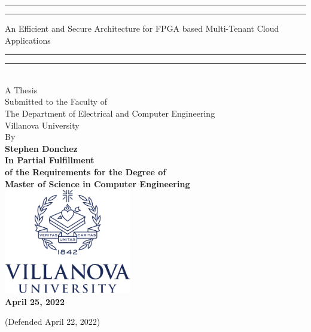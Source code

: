 \begin{titlepage}
    \begingroup

\centering

\sffamily\bfseries\fontsize{24.88}{31.2}\selectfont
\rule{\textwidth}{1.6pt}\vspace*{-\baselineskip}\vspace*{2pt} %
	\rule{\textwidth}{0.4pt} %
	
	\vspace{0.5\baselineskip} %
	An Efficient and Secure Architecture for FPGA based Multi-Tenant Cloud Applications

\rule{\textwidth}{1.6pt}\vspace*{-\baselineskip}\vspace*{2pt} %
	\rule{\textwidth}{0.4pt} %
\\[0.4in]
\normalfont\large
A Thesis\\
Submitted to the Faculty of\\
The Department of Electrical and Computer Engineering\\
 Villanova University\\
 \vspace{.2in}
 By
\\
\vspace{0.25in}
\sffamily\bfseries\Large
Stephen Donchez
\\[0.4in]
\normalfont\normalsize
In Partial Fulfillment\\ of the Requirements for the Degree of\\

Master of Science in Computer Engineering
\\[1.5em]
\includegraphics[height=1.8in]{ECE_ReportTemplate/vulogo}\\
[2em]
April 25, 2022

(Defended April 22, 2022)
\par
\endgroup

\end{titlepage}